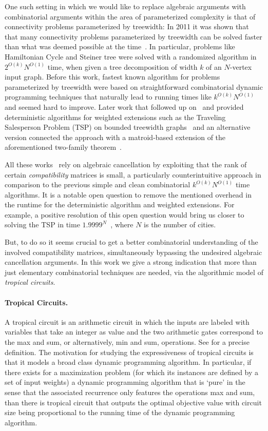One such setting in which we would like to replace algebraic arguments with combinatorial arguments within the area of parameterized complexity is that of connectivity problems parameterized by treewidth: In 2011 it was shown that that many connectivity problems parameterized by treewidth can be solved faster than what was deemed possible at the time~\cite{CyganNPPRW22}. In particular, problems like Hamiltonian Cycle and Steiner tree were solved with a randomized algorithm in $2^{O(k)}N^{O(1)}$ time, when given a tree decomposition of width $k$ of an $N$-vertex input graph. Before this work, fastest known algorithm for problems parameterized by treewidth were based on straightforward combinatorial dynamic programming techniques that naturally lead to running times like $k^{O(k)}N^{O(1)}$ and seemed hard to improve. Later work that followed up on~\cite{CyganNPPRW22} and provided deterministic algorithms for weighted extensions such as the Traveling Salesperson Problem (TSP) on bounded treewidth graphs~\cite{BodlaenderCKN15} and an alternative version connected the approach with a matroid-based extension of the aforementioned two-family theorem~\cite{FominLPS16}.

All these works~\cite{CyganNPPRW22,BodlaenderCKN15,FominLPS16} rely on algebraic cancellation by exploiting that the rank of certain \emph{compatibility} matrices is small, a particularly counterintuitive approach in comparison to the previous simple and clean combinatorial $k^{O(k)}N^{O(1)}$ time algorithms. It is a notable open question to remove the mentioned overhead in the runtime for the deterministic algorithm and weighted extensions. For example, a positive resolution of this open question would bring us closer to solving the TSP in time $1.9999^N$~\cite{Nederlof20}, where $N$ is the number of cities.

But, to do so it seems crucial to get a better combinatorial understanding of the involved compatibility matrices, simultaneously bypassing the undesired algebraic cancellation arguments. In this work we give a strong indication that more than just elementary combinatorial techniques are needed, via the algorithmic model of \emph{tropical circuits}.

\paragraph{Tropical Circuits.} A tropical circuit is an arithmetic circuit in which the inputs are labeled with variables that take an integer as value and the two arithmetic gates correspond to the max and sum, or alternatively, min and sum, operations. See  for a precise definition. The motivation for studying the expressiveness of tropical circuits is that it models a broad class dynamic programming algorithm. In particular, if there exists for a maximization problem (for which its instances are defined by a set of input weights) a dynamic programming algorithm that is `pure' in the sense that the associated recurrence only features the operations max and sum, than there is tropical circuit that outputs the optimal objective value with circuit size being proportional to the running time of the dynamic programming algorithm.

